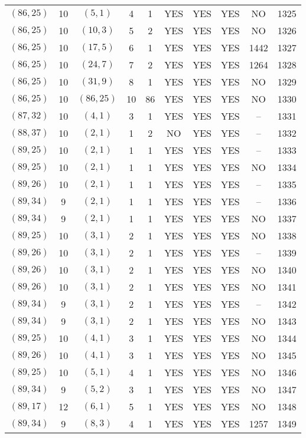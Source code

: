 \begin{longtable}{|c|c|c|c|c|c|c|c|c|c|}
$(86, 25)$ & 10 & $(5, 1)$ & 4 & 1 & YES & YES & YES & NO & 1325\\
$(86, 25)$ & 10 & $(10, 3)$ & 5 & 2 & YES & YES & YES & NO & 1326\\
$(86, 25)$ & 10 & $(17, 5)$ & 6 & 1 & YES & YES & YES & 1442 & 1327\\
$(86, 25)$ & 10 & $(24, 7)$ & 7 & 2 & YES & YES & YES & 1264 & 1328\\
$(86, 25)$ & 10 & $(31, 9)$ & 8 & 1 & YES & YES & YES & NO & 1329\\
$(86, 25)$ & 10 & $(86, 25)$ & 10 & 86 & YES & YES & YES & NO & 1330\\
$(87, 32)$ & 10 & $(4, 1)$ & 3 & 1 & YES & YES & YES & -- & 1331\\
$(88, 37)$ & 10 & $(2, 1)$ & 1 & 2 & NO & YES & YES & -- & 1332\\
$(89, 25)$ & 10 & $(2, 1)$ & 1 & 1 & YES & YES & YES & -- & 1333\\
$(89, 25)$ & 10 & $(2, 1)$ & 1 & 1 & YES & YES & YES & NO & 1334\\
$(89, 26)$ & 10 & $(2, 1)$ & 1 & 1 & YES & YES & YES & -- & 1335\\
$(89, 34)$ & 9 & $(2, 1)$ & 1 & 1 & YES & YES & YES & -- & 1336\\
$(89, 34)$ & 9 & $(2, 1)$ & 1 & 1 & YES & YES & YES & NO & 1337\\
$(89, 25)$ & 10 & $(3, 1)$ & 2 & 1 & YES & YES & YES & NO & 1338\\
$(89, 26)$ & 10 & $(3, 1)$ & 2 & 1 & YES & YES & YES & -- & 1339\\
$(89, 26)$ & 10 & $(3, 1)$ & 2 & 1 & YES & YES & YES & NO & 1340\\
$(89, 26)$ & 10 & $(3, 1)$ & 2 & 1 & YES & YES & YES & NO & 1341\\
$(89, 34)$ & 9 & $(3, 1)$ & 2 & 1 & YES & YES & YES & -- & 1342\\
$(89, 34)$ & 9 & $(3, 1)$ & 2 & 1 & YES & YES & YES & NO & 1343\\
$(89, 25)$ & 10 & $(4, 1)$ & 3 & 1 & YES & YES & YES & NO & 1344\\
$(89, 26)$ & 10 & $(4, 1)$ & 3 & 1 & YES & YES & YES & NO & 1345\\
$(89, 25)$ & 10 & $(5, 1)$ & 4 & 1 & YES & YES & YES & NO & 1346\\
$(89, 34)$ & 9 & $(5, 2)$ & 3 & 1 & YES & YES & YES & NO & 1347\\
$(89, 17)$ & 12 & $(6, 1)$ & 5 & 1 & YES & YES & YES & NO & 1348\\
$(89, 34)$ & 9 & $(8, 3)$ & 4 & 1 & YES & YES & YES & 1257 & 1349\\

\end{longtable}
